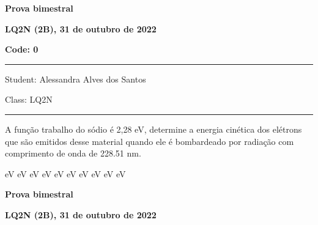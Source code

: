 \documentclass[12pt, addpoints]{exam}
\begin{document}
        \begin{minipage}[b]{0.75\linewidth}
            \begin{flushleft}
                {\bf \large Prova bimestral}
            \end{flushleft}
            \begin{flushleft}
                {\bf \large LQ2N (2B), 31 de outubro de 2022}
            \end{flushleft}
        \end{minipage}
        \begin{minipage}[b]{0.20\linewidth}
            \begin{flushright}
                {\bf \large Code: 0}
            \end{flushright}
        \end{minipage}
        \vspace{0.5cm} \hrule \vspace{0.5cm}
        \begin{minipage}{0.75\linewidth}
            \begin{flushleft}
                Student: Alessandra Alves dos Santos
            \end{flushleft}
        \end{minipage}
        \begin{minipage}{0.20\linewidth}
            \begin{flushright}
                Class: LQ2N
            \end{flushright}
        \end{minipage}
        \vspace{0.5cm} \hrule \vspace{0.5cm}
        \begin{questions}
\begin{multicols*}{2}
\question A função trabalho do sódio é 2,28 eV, determine a energia cinética dos elétrons que são emitidos desse material quando ele é bombardeado por radiação com comprimento de onda de  228.51 nm.

\begin{oneparchoices}
 eV eV eV eV eV eV eV eV eV eV
\end{oneparchoices}\end{multicols*}
\end{questions}
\newpage
        \begin{minipage}[b]{0.75\linewidth}
            \begin{flushleft}
                {\bf \large Prova bimestral}
            \end{flushleft}
            \begin{flushleft}
                {\bf \large LQ2N (2B), 31 de outubro de 2022}
            \end{flushleft}
        \end{minipage}
\end{document}
